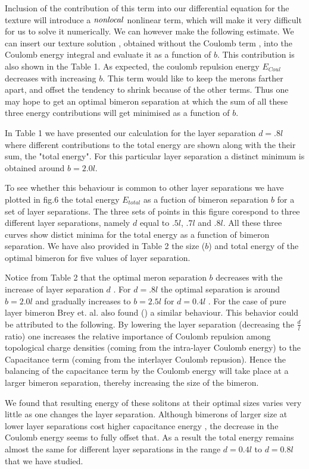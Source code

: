 Inclusion of the contribution of this term into our
differential equation for the
texture will introduce a $\it{nonlocal}$ nonlinear term, which will make
it very difficult for us to solve it numerically. We can however make the
following estimate. We can insert our texture solution , obtained without 
the Coulomb term , into the Coulomb energy integral and evaluate it as a 
function of $b$. This contribution is also shown in the Table 1.
As expected, the coulomb repulsion
energy $E_{Coul}$ decreases with increasing $b$. This
term would like to keep the merons farther apart, and 
offset the tendency 
to shrink because of the other terms. 
Thus one may hope to get an optimal bimeron separation at which
the sum of all these three energy contributions will get minimised as a
function of $b$. 

In Table 1 we have presented our calculation for the layer
separation $d = .8l$ where different contributions to the total energy
are shown along with the their sum, the "total energy". For this particular
layer separation a distinct minimum is obtained around $b = 2.0 l$.

To see whether this behaviour is common to other layer separations 
we have plotted in fig.6 the total energy
$E_{total}$ as a fuction of bimeron
separation $b$ for a set of layer separations.
The three sets of points in this figure corespond to three
different layer separations, namely $d$ equal to $.5l$, $.7l$ and $.8l$.
All these three curves show distict minima for the total energy as a
function of bimeron separation. We have 
also provided in Table 2 the size ($b$) and total energy of the optimal
bimeron for five values of layer separation.

Notice from Table 2 that the optimal
meron separation $b$ decreases with the increase of layer separation $d$
. For $d=.8l$
the optimal separation
is around $b=2.0l$ and gradually increases to $ b=2.5 l$
for $d=0.4l$ . For the
case of pure layer bimeron Brey et. al. also found (\cite{Brey}) 
a similar behaviour.
This behavior could be attributed to the following.
By lowering the layer separation (decreasing the $\frac{d}{l}$ ratio) one
increases the relative importance of Coulomb repulsion
among topological charge densities (coming from the intra-layer Coulomb
energy) to the Capacitance term (coming from the interlayer Coulomb
repusion). Hence
the balancing of the capacitance
term by the Coulomb energy will take place at a larger bimeron separation,
thereby increasing the size of the bimeron. 

We found that resulting energy of these solitons
at their optimal sizes varies very little as one changes the layer
separation. Although bimerons of larger size at lower layer
separations cost higher capacitance energy , the decrease in the
Coulomb energy seems to fully offset that.
As a result the total energy remains
almost the same for different layer separations in the range $d=0.4 l$ 
to $d= 0.8 l$ that we have studied.

